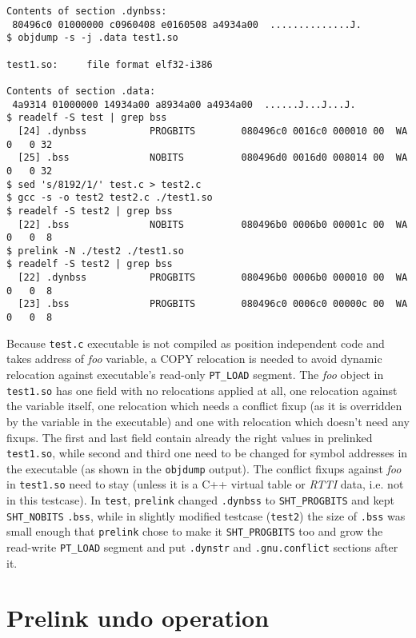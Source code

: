 \documentclass[twoside]{article}
\def\tts#1{\texttt{\small #1}}
\begin{document}
{{\begin{verbatim}
Contents of section .dynbss:
 80496c0 01000000 c0960408 e0160508 a4934a00  ..............J.
$ objdump -s -j .data test1.so

test1.so:     file format elf32-i386

Contents of section .data:
 4a9314 01000000 14934a00 a8934a00 a4934a00  ......J...J...J.
$ readelf -S test | grep bss
  [24] .dynbss           PROGBITS        080496c0 0016c0 000010 00  WA  0   0 32
  [25] .bss              NOBITS          080496d0 0016d0 008014 00  WA  0   0 32
$ sed 's/8192/1/' test.c > test2.c
$ gcc -s -o test2 test2.c ./test1.so
$ readelf -S test2 | grep bss
  [22] .bss              NOBITS          080496b0 0006b0 00001c 00  WA  0   0  8
$ prelink -N ./test2 ./test1.so
$ readelf -S test2 | grep bss
  [22] .dynbss           PROGBITS        080496b0 0006b0 000010 00  WA  0   0  8
  [23] .bss              PROGBITS        080496c0 0006c0 00000c 00  WA  0   0  8
\end{verbatim}}
\prelinklistingcaption{Relocation handling of \tts{.dynbss} objects}}

Because \tts{test.c} executable is not compiled as position independent code and
takes address of {\sl foo} variable, a COPY relocation is needed to avoid
dynamic relocation against executable's read-only \tts{PT\_LOAD} segment.
The {\sl foo} object in \tts{test1.so} has one field with no relocations
applied at all, one relocation against the variable itself, one relocation
which needs a conflict fixup (as it is overridden by the variable in the
executable) and one with relocation which doesn't need any fixups.
The first and last field contain already the right values in prelinked
\tts{test1.so}, while second and third one need to be changed for symbol
addresses in the executable (as shown in the \tts{objdump} output).
The conflict fixups against {\sl foo} in \tts{test1.so} need to stay
(unless it is a C++ virtual table or {\sl RTTI} data, i.e. not in this testcase).
In \tts{test}, \tts{prelink} changed \tts{.dynbss} to \tts{SHT\_PROGBITS}
and kept \tts{SHT\_NOBITS} \tts{.bss}, while in slightly modified testcase
(\tts{test2}) the size of \tts{.bss} was small enough that \tts{prelink}
chose to make it \tts{SHT\_PROGBITS} too and grow the read-write
\tts{PT\_LOAD} segment and put \tts{.dynstr} and \tts{.gnu.conflict}
sections after it.

\section{Prelink undo operation}
\end{document}
